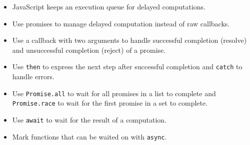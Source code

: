 \begin{itemize}
\item
  JavaScript keeps an execution queue for delayed computations.
\item
  Use promises to manage delayed computation instead of raw callbacks.
\item
  Use a callback with two arguments to handle successful completion (resolve) and unsuccessful completion (reject) of a promise.
\item
  Use \texttt{then} to express the next step after successful completion and \texttt{catch} to handle errors.
\item
  Use \texttt{Promise.all} to wait for all promises in a list to complete and \texttt{Promise.race} to wait for the first promise in a set to complete.
\item
  Use \texttt{await} to wait for the result of a computation.
\item
  Mark functions that can be waited on with \texttt{async}.
\end{itemize}
